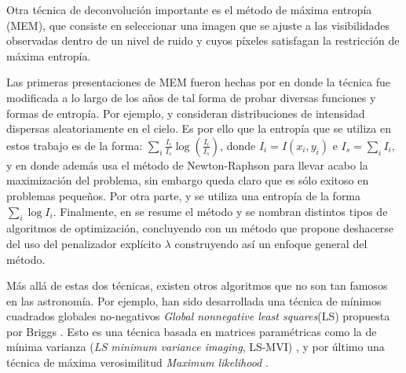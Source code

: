 Otra técnica de deconvolución importante es el método de máxima entropía (MEM), que consiste en seleccionar una imagen que se ajuste a las visibilidades observadas dentro de un nivel de ruido y cuyos píxeles satisfagan la restricción de máxima entropía.

Las primeras presentaciones de MEM fueron hechas por \citep{FRIEDEN:72, mem2, daddario, themaxen, skilling1984} en donde la técnica fue modificada a lo largo de los años de tal forma de probar diversas funciones y formas de entropía. Por ejemplo, \citep{FRIEDEN:72} y \citep{themaxen} consideran distribuciones de intensidad dispersas aleatoriamente en el cielo. Es por ello que la entropía que se utiliza en estos trabajo es de la forma: $\sum_{i}\frac{I_{i}}{I_{s}}\log(\frac{I_{i}}{I_{s}})$, donde $I_{i}=I(x_{i}, y_{i})$ e $I_{s}=\sum_{i}I_{i}$, y en donde además \citep{FRIEDEN:72} usa el método de Newton-Raphson para llevar acabo la maximización del problema, sin embargo queda claro que es sólo exitoso en problemas pequeños. Por otra parte, \citep{mem2} y \citep{daddario} se utiliza una entropía de la forma $\sum_{i}\log I_{i}$. Finalmente, en \citep{skilling1984} se resume el método y se nombran distintos tipos de algoritmos de optimización, concluyendo con un método que propone deshacerse del uso del penalizador explícito $\lambda$ construyendo así un enfoque general del método.








Más allá de estas dos técnicas, existen otros algoritmos que no son tan famosos en las astronomía. Por ejemplo, han sido desarrollada una técnica de mínimos cuadrados globales no-negativos \textit{Global nonnegative least squares}(LS) propuesta por Briggs \citep{briggs1995}. Esto es una técnica basada en matrices paramétricas como la de mínima varianza (\textit{LS minimum variance imaging}, LS-MVI) \citep{Lesheradioastronomical}, y por último una técnica de máxima verosimilitud \textit{Maximum likelihood} \citep{BenDavid:2008ff}.

